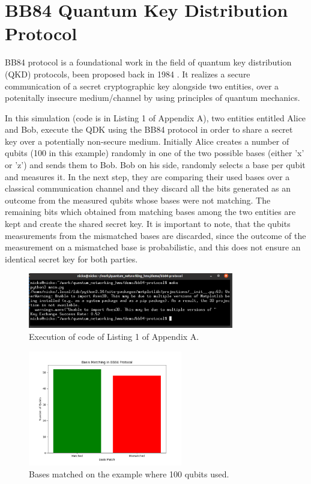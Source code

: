 \documentclass[12pt,a4paper] {report}
\begin{document}
		\section{BB84 Quantum Key Distribution Protocol}

		BB84 protocol is a foundational work in the field
		of quantum key distribution (QKD) protocols,
		been proposed back in 1984 \cite{bb84}.
		It realizes a secure communication of a secret cryptographic key
		alongside two entities, over a potenitally insecure medium/channel
		by using principles of quantum mechanics.
		
		In this simulation (code is in Listing 1 of Appendix A),
		two entities entitled Alice and Bob, execute the QDK using the BB84 protocol
		in order to share a secret key over a potentially non-secure medium. Initially Alice creates
		a number of qubits (100 in this example) randomly in one of the two possible bases (either 'x' or 'z') and sends them 
		to Bob. Bob on his side, randomly selects a base per qubit and measures it. In the next step, 
		they are comparing their used bases over a classical communication channel and 
		they discard all the bits generated as an outcome from the measured qubits whose bases were not matching.
		The remaining bits which obtained from matching bases among the two entities are kept and create the shared secret key.
		It is important to note, that the qubits measurements from the mismatched bases are 
		discarded, since the outcome of the measurement on a mismatched base is probabilistic,
		and this does not ensure an identical secret key for both parties.
		\begin{figure}[h!]
			\centering
			\includegraphics[width=0.8\textwidth]{bb84/success_rate_terminal.png}
			\caption{Execution of code of Listing 1 of Appendix A.}
			\label{fig:}
		\end{figure}		

		\begin{figure}[h!]
			\centering
			\includegraphics[width=0.6\textwidth]{bb84/basis_matching.png}
			\caption{Bases matched on the example where 100 qubits used.}
			\label{fig:}
		\end{figure}		
\end{document}

